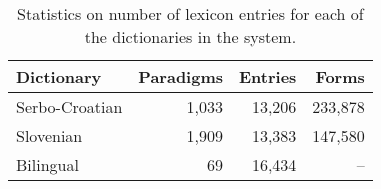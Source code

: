 \begin{table}
\begin{center}
\begin{tabular}{|l|rrr|}
\hline
\textbf{Dictionary} & \textbf{Paradigms} & \textbf{Entries} & \textbf{Forms} \\
\hline
Serbo-Croatian &  1,033 & 13,206 & 233,878 \\
Slovenian &  1,909 & 13,383 & 147,580 \\
\hline
Bilingual &  69 &  16,434 & -- \\
\hline
\end{tabular}
\caption{Statistics on number of lexicon entries for each of the dictionaries in the 
   system.}
\label{table:lexicons}
\end{center}
\end{table}



